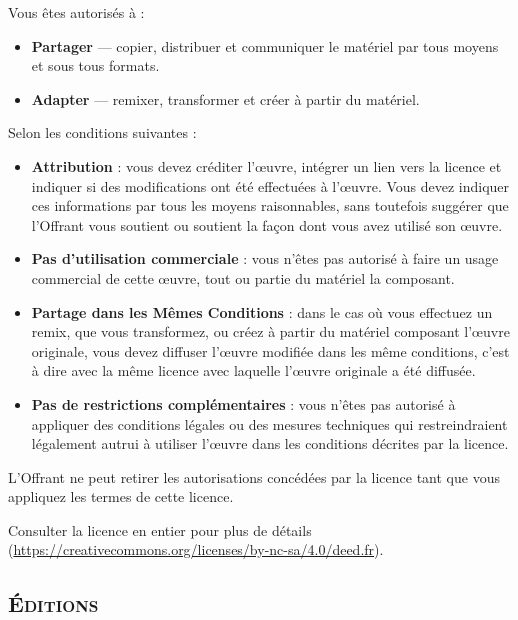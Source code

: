 \documentclass{article}
\begin{document}
\medskip

Vous êtes autorisés à :

\begin{itemize}
	\item \textbf{Partager} --- copier, distribuer et communiquer le matériel par tous moyens et sous tous formats.
	\item \textbf{Adapter} --- remixer, transformer et créer à partir du matériel.
\end{itemize}

\bigskip

Selon les conditions suivantes :

\begin{itemize}
	\item \textbf{Attribution} : vous devez créditer l'\oe{}uvre, intégrer un lien vers la licence et indiquer si des modifications ont été effectuées à l'\oe{}uvre. Vous devez indiquer ces informations par tous les moyens raisonnables, sans toutefois suggérer que l'Offrant vous soutient ou soutient la façon dont vous avez utilisé son \oe{}uvre. 
	\item \textbf{Pas d'utilisation commerciale} : vous n'êtes pas autorisé à faire un usage commercial de cette \oe{}uvre, tout ou partie du matériel la composant. 
	\item \textbf{Partage dans les Mêmes Conditions} : dans le cas où vous effectuez un remix, que vous transformez, ou créez à partir du matériel composant l'\oe{}uvre originale, vous devez diffuser l'\oe{}uvre modifiée dans les même conditions, c'est à dire avec la même licence avec laquelle l'\oe{}uvre originale a été diffusée.
	\item \textbf{Pas de restrictions complémentaires} : vous n'êtes pas autorisé à appliquer des conditions légales ou des mesures techniques qui restreindraient légalement autrui à utiliser l'\oe{}uvre dans les conditions décrites par la licence. 
\end{itemize}

\bigskip

L'Offrant ne peut retirer les autorisations concédées par la licence tant que vous appliquez les termes de cette licence.

\bigskip

Consulter la licence en entier pour plus de détails (\url{https://creativecommons.org/licenses/by-nc-sa/4.0/deed.fr}).



\newpage

\nocite{*}

\begin{center}
	\section*{\textsc{Éditions}}
\end{center}

\bigskip

\printbibheading[heading=none]
\bibbycategory

\end{document}
